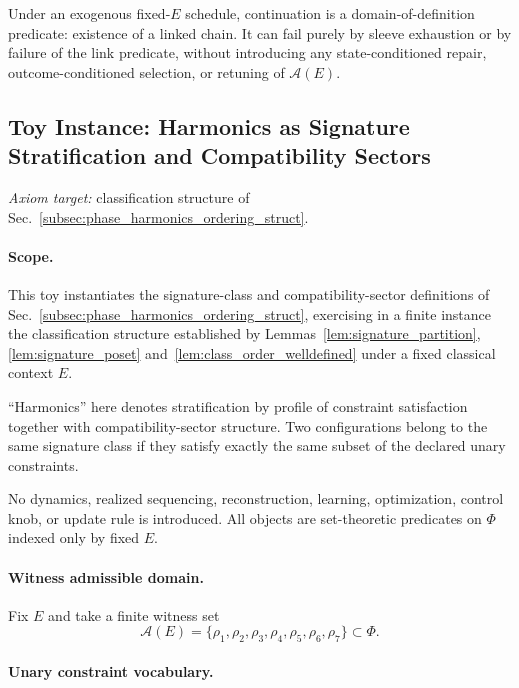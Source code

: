 \documentclass[aps,prx,onecolumn,11pt]{revtex4-2}
\theoremstyle{plain}
\theoremstyle{definition}
\theoremstyle{remark}
\begin{document}
Under an exogenous fixed-\(E\) schedule, continuation is a
domain-of-definition predicate: existence of a linked chain. It can
fail purely by sleeve exhaustion or by failure of the link predicate,
without introducing any state-conditioned repair, outcome-conditioned
selection, or retuning of \(\mathcal A(E)\).

\subsection{Toy Instance: Harmonics as Signature Stratification and Compatibility Sectors}
\label{toy:harmonics_instance}

\noindent\emph{Axiom target:} classification structure of Sec.~\ref{subsec:phase_harmonics_ordering_struct}.

\paragraph{Scope.}

This toy instantiates the signature-class and compatibility-sector
definitions of Sec.~\ref{subsec:phase_harmonics_ordering_struct},
exercising in a finite instance the classification structure
established by Lemmas~\ref{lem:signature_partition},
\ref{lem:signature_poset} and~\ref{lem:class_order_welldefined}
under a fixed classical context \(E\).

``Harmonics'' here denotes stratification by profile of constraint
satisfaction together with compatibility-sector structure. Two
configurations belong to the same signature class if they satisfy
exactly the same subset of the declared unary constraints.

No dynamics, realized sequencing, reconstruction, learning,
optimization, control knob, or update rule is introduced. All objects
are set-theoretic predicates on \(\Phi\) indexed only by fixed \(E\).

\paragraph{Witness admissible domain.}

Fix \(E\) and take a finite witness set
\[
\mathcal A(E)
=
\{
\rho_1,\rho_2,\rho_3,\rho_4,\rho_5,\rho_6,\rho_7
\}
\subset\Phi.
\]

\paragraph{Unary constraint vocabulary.}
\end{document}
